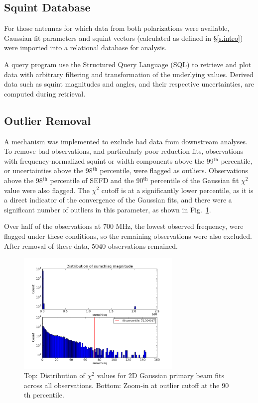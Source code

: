 \documentclass[preprint]{aastex}
\begin{document}
\subsection{Squint Database}\label{ss.database}
For those antennas for which data from both polarizations were available, 
Gaussian fit parameters and squint vectors (calculated as defined in 
\S\ref{s.intro}) were imported into a relational database for analysis.

A query program use the Structured Query Language (SQL) to retrieve
and plot data with arbitrary filtering and transformation of the
underlying values. Derived data such as squint magnitudes and angles,
and their respective uncertainties, are computed during retrieval.

\subsection{Outlier Removal}\label{ss.outliers}
A mechanism was implemented to exclude bad data from downstream
analyses.  To remove bad observations, and particularly poor reduction
fits, observations with frequency-normalized squint or width
components above the 99$^\textrm{th}$ percentile, or uncertainties above the
98$^\textrm{th}$ percentile, were flagged as outliers.  Observations
above the 98$^\textrm{th}$ percentile of SEFD and the 90$^\textrm{th}$
percentile of the Gaussian fit $\chi^2$ value were also flagged.  The
$\chi^2$ cutoff is at a significantly lower percentile, as it is a
direct indicator of the convergence of the Gaussian fits, and there
were a significant number of outliers in this parameter, as shown in
Fig.~\ref{fig.dist_sumchisq}.

Over half of the observations at 700 MHz, the lowest observed frequency,
were flagged under these conditions, so the remaining observations
were also excluded.  After removal of
these data, 5040 observations remained.

\begin{figure}[htb]
\begin{center}
\includegraphics[width=0.7\textwidth]{images/dist_sumchisq}
\caption{Top: Distribution of $\chi^2$ values for 2D Gaussian primary
  beam fits across all observations.  Bottom: Zoom-in at outlier
  cutoff at the 90$\textrm{th}$ percentile. \label{fig.dist_sumchisq}}
\end{center}
\end{figure}
\end{document}
